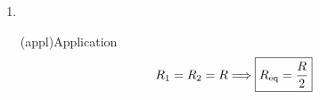 \documentclass[../../main/main.tex]{subfiles}
\begin{document}
{\begin{enumerate}
\begin{tcbraster}[raster columns=2, raster equal height=rows]
\begin{tcb}
              vérifier l'homogénéité d'un résultat littéral avant de l'encadrer.
              Cette erreur est une des plus communes.
			      \end{tcb}
			      \begin{tcb}(appl)'r'{Application}
				      En mettant les deux termes sur même dénominateur~:
				      \begin{align*}
					      \frac{1}{ R_{\rm eq}}                 & = \frac{1}{R_1}\times \textcolor{orange}{
						      \frac{R_2}{R_2}} + \frac{1}{R_2}\times \textcolor{orange}{
					      \frac{R_1}{R_1}}                                                                  \\
					      \Leftrightarrow \frac{1}{ R_{\rm eq}} & = \frac{R_2 + R_1}{R_1R_2}                \\
					      \Leftrightarrow R_{\rm eq}            & = \frac{R_1R_2}{R_1+R_2}
				      \end{align*}
			      \end{tcb}
		      \end{tcbraster}

        \item ~
		      \begin{center}
			      \begin{tcb}[width=\linewidth](appl){Application}
				      \[R_1 = R_2 = R \Longrightarrow \boxed{ R_{\rm eq} = \frac{R}{2}}\]
			      \end{tcb}
		      \end{center}


\end{enumerate}}
\end{document}
